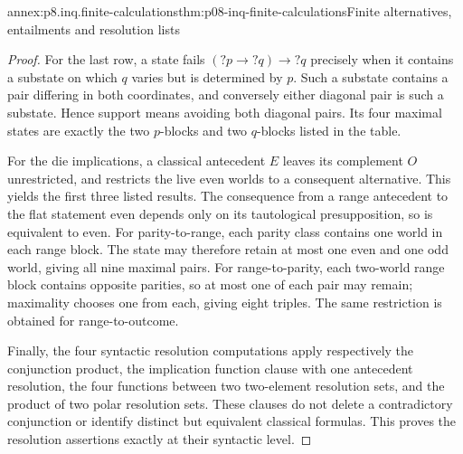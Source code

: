 \begin{annexitem}{annex:p8.inq.finite-calculations}{thm:p08-inq-finite-calculations}{Finite alternatives, entailments and resolution lists}
\begin{proof}
For the last row, a state fails \((?p\to?q)\to?q\) precisely
when it contains a substate on which \(q\) varies but is determined
by \(p\). Such a substate contains a pair differing in both
coordinates, and conversely either diagonal pair is such a substate.
Hence support means avoiding both diagonal pairs. Its four maximal
states are exactly the two \(p\)-blocks and two \(q\)-blocks
listed in the table.

For the die implications, a classical antecedent \(E\) leaves
its complement \(O\) unrestricted, and restricts the live even
worlds to a consequent alternative. This yields the first three
listed results. The consequence from a range antecedent to the
flat statement even depends only on its tautological presupposition,
so is equivalent to even. For parity-to-range, each parity class
contains one world in each range block. The state may therefore
retain at most one even and one odd world, giving all nine maximal
pairs. For range-to-parity, each two-world range block contains
opposite parities, so at most one of each pair may remain; maximality
chooses one from each, giving eight triples. The same restriction
is obtained for range-to-outcome.

Finally, the four syntactic resolution computations apply respectively
the conjunction product, the implication function clause with one
antecedent resolution, the four functions between two two-element
resolution sets, and the product of two polar resolution sets.
These clauses do not delete a contradictory conjunction or identify
distinct but equivalent classical formulas. This proves the
resolution assertions exactly at their syntactic level.
\end{proof}
\end{annexitem}
